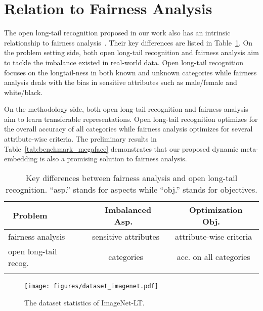\documentclass[10pt,twocolumn,letterpaper]{article}
\begin{document}
\section{Relation to Fairness Analysis}
\label{sec:fairness}

The open long-tail recognition proposed in our work also has an intrinsic relationship to fairness analysis~\cite{dwork2012fairness, zemel2013learning, madras2018learning, mitchell2018model, anne2018women}. Their key differences are listed in Table~\ref{tab:differences}.
On the problem setting side, both open long-tail recognition and fairness analysis aim to tackle the imbalance existed in real-world data.
Open long-tail recognition focuses on the longtail-ness in both known and unknown categories while fairness analysis deals with the bias in sensitive attributes such as male/female and white/black.

On the methodology side, both open long-tail recognition and fairness analysis aim to learn transferable representations.
Open long-tail recognition optimizes for the overall accuracy of all categories while fairness analysis optimizes for several attribute-wise criteria.
The preliminary results in Table~\ref{tab:benchmark_megaface} demonstrates that our proposed dynamic meta-embedding is also a promising solution to fairness analysis.



\begin{table}[h]
    \footnotesize
    \centering
    \begin{tabular}{l|c|c}
    \Xhline{1pt}
    ~{\bf Problem}~ & ~{\bf Imbalanced Asp.}~ & ~{\bf Optimization Obj.}~ \\ \hline \hline
    fairness analysis & sensitive attributes  & attribute-wise criteria \\ \hline
    open long-tail recog. & categories  & acc. on all categories \\
    \Xhline{1pt}
    \end{tabular}
    \caption{Key differences between fairness analysis and open long-tail recognition. ``asp.'' stands for aspects while ``obj.'' stands for objectives.}
    \label{tab:differences}
\end{table}



\begin{figure*}[t]
  \centering
  \texttt{[image: figures/dataset\_imagenet.pdf]}
  \vspace{-10pt}
  \caption{The dataset statistics of ImageNet-LT.}
  \label{fig:dataset_imagenet}
  \vspace{-10pt}
\end{figure*}
\end{document}
